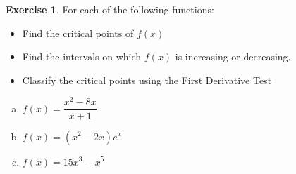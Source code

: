 \documentclass[11pt,reqno,final]{amsart}
\numberwithin{figure}{section}
\theoremstyle{definition} %
\newtheorem{exercise}[question]{Exercise}
\begin{document}
\begin{exercise}
        For each of the following functions:
        \begin{itemize}
        \item Find the critical points of $f(x)$
        \item Find the intervals on which $f(x)$ is increasing or decreasing.
        \item Classify the critical points using the First Derivative Test
        \end{itemize}
        
        \begin{enumerate}[(a)]
        \item $f(x) = \dfrac{x^2 - 8x}{x+1}$
                \vfill
                \newpage
        \item $f(x) = (x^2-2x)e^x$
                \vfill
        \item $f(x) = 15x^3-x^5$
                \vfill
        \end{enumerate}
\end{exercise}
\end{document}
